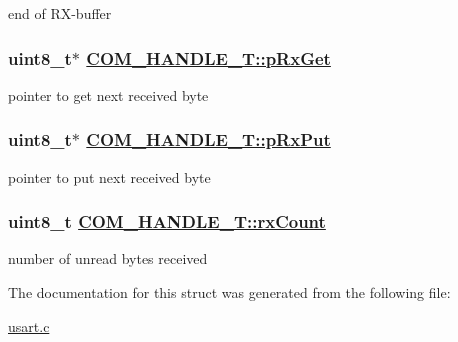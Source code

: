 end of RX-buffer \hypertarget{struct_c_o_m___h_a_n_d_l_e___t_o1}{
\subsubsection[pRxGet]{\setlength{\rightskip}{0pt plus 5cm}uint8\_\-t$\ast$ \hyperlink{struct_c_o_m___h_a_n_d_l_e___t_o1}{COM\_\-HANDLE\_\-T::p\-Rx\-Get}}}
\label{struct_c_o_m___h_a_n_d_l_e___t_o1}


pointer to get next received byte \hypertarget{struct_c_o_m___h_a_n_d_l_e___t_o0}{
\subsubsection[pRxPut]{\setlength{\rightskip}{0pt plus 5cm}uint8\_\-t$\ast$ \hyperlink{struct_c_o_m___h_a_n_d_l_e___t_o0}{COM\_\-HANDLE\_\-T::p\-Rx\-Put}}}
\label{struct_c_o_m___h_a_n_d_l_e___t_o0}


pointer to put next received byte \hypertarget{struct_c_o_m___h_a_n_d_l_e___t_o4}{
\subsubsection[rxCount]{\setlength{\rightskip}{0pt plus 5cm}uint8\_\-t \hyperlink{struct_c_o_m___h_a_n_d_l_e___t_o4}{COM\_\-HANDLE\_\-T::rx\-Count}}}
\label{struct_c_o_m___h_a_n_d_l_e___t_o4}


number of unread bytes received 

The documentation for this struct was generated from the following file:\begin{CompactItemize}
\item 
\hyperlink{usart_8c}{usart.c}\end{CompactItemize}
